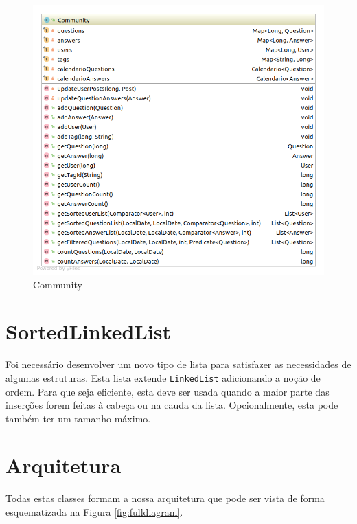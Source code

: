 \documentclass[10pt,a4paper]{report}
\begin{document}
    \begin{figure}[H]
        \centering
        \includegraphics[width=\textwidth]{./images/Community.png}
        \caption{Community}
    \end{figure}

    \section{SortedLinkedList}
    \label{sec:sortedLinkedList}
    Foi necessário desenvolver um novo tipo de lista para satisfazer as
    necessidades de algumas estruturas.
    Esta lista extende \texttt{LinkedList} adicionando a noção de
    ordem. Para que seja eficiente, esta deve ser usada quando a maior parte
    das inserções forem feitas à cabeça ou na cauda da lista. Opcionalmente,
    esta pode também ter um tamanho máximo.

    \section{Arquitetura}
    Todas estas classes formam a nossa arquitetura que pode ser vista de forma
    esquematizada na Figura \ref{fig:fulldiagram}.
\end{document}
